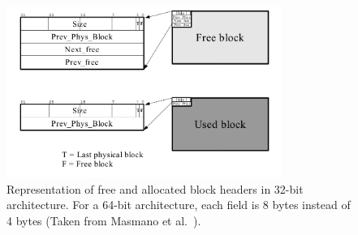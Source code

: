 \begin{figure}[H]
    \centering
    \includegraphics[width=0.80\textwidth]{figures/blockheader_reference.png}
    \caption{Representation of free and allocated block headers in 32-bit architecture. For a 64-bit architecture, each field is 8 bytes instead of 4 bytes (Taken from Masmano et al.~\cite{TLSF}).}
    \label{fig:blockheader_reference}
\end{figure}

